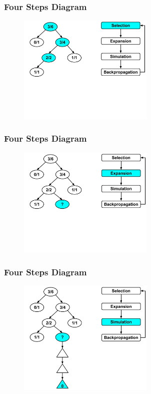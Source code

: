 \documentclass{beamer}
\begin{document}
\begin{frame}[fragile]
\frametitle{Four Steps Diagram}
\begin{figure}[h]
	\includegraphics[width=6.5cm]{Diagrams/MCTSShort/MCTSShortOneOneThree.pdf}
	\centering
\end{figure}
\end{frame}


\begin{frame}[fragile]
\frametitle{Four Steps Diagram}
\begin{figure}[h]
	\includegraphics[width=6.5cm]{Diagrams/MCTSShort/MCTSShortOneTwo.pdf}
	\centering
\end{figure}
\end{frame}

\begin{frame}[fragile]
\frametitle{Four Steps Diagram}
\begin{figure}[h]
	\includegraphics[width=6.5cm]{Diagrams/MCTSShort/MCTSShortOneThree.pdf}
	\centering
\end{figure}
\end{frame}
\end{document}
